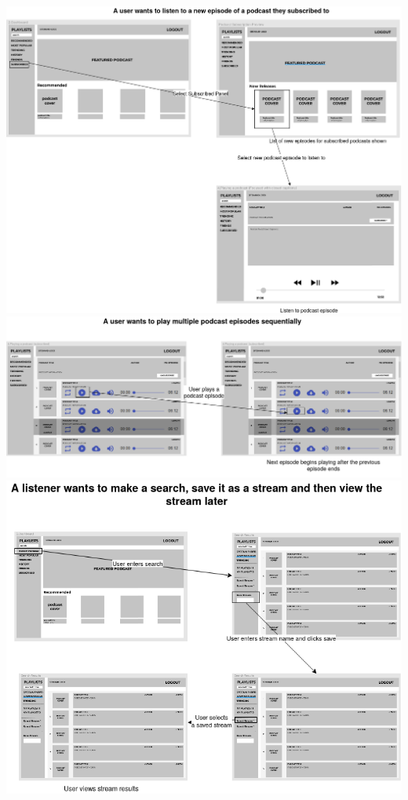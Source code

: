 \documentclass[12pt]{article}
\begin{document}
\begin{appendices}
\begin{center}
    \includegraphics[width=\textwidth]{resources/podcast_subscription_preview}
    \includegraphics[width=\textwidth]{resources/autoplay}
    \includegraphics[width=\textwidth]{resources/save_stream}
\end{center}
\end{appendices}
\end{document}
